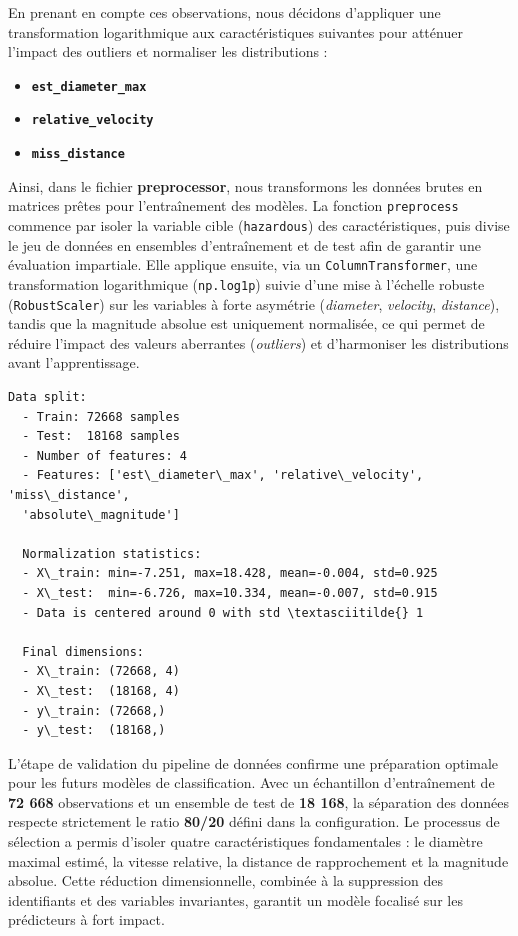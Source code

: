 \documentclass[11pt]{article}
\providecommand{\tightlist}{%
      \setlength{\itemsep}{0pt}\setlength{\parskip}{0pt}}
\begin{document}
En prenant en compte ces observations, nous décidons d'appliquer une
transformation logarithmique aux caractéristiques suivantes pour
atténuer l'impact des outliers et normaliser les distributions :

\begin{itemize}
  \tightlist
  \item
        \textbf{\texttt{est\_diameter\_max}}
  \item
        \textbf{\texttt{relative\_velocity}}
  \item
        \textbf{\texttt{miss\_distance}}
\end{itemize}

Ainsi, dans le fichier \textbf{preprocessor}, nous transformons les
données brutes en matrices prêtes pour l'entraînement des modèles. La
fonction \texttt{preprocess} commence par isoler la variable cible
(\texttt{hazardous}) des caractéristiques, puis divise le jeu de données
en ensembles d'entraînement et de test afin de garantir une évaluation
impartiale. Elle applique ensuite, via un \texttt{ColumnTransformer},
une transformation logarithmique (\texttt{np.log1p}) suivie d'une mise à
l'échelle robuste (\texttt{RobustScaler}) sur les variables à forte
asymétrie (\emph{diameter}, \emph{velocity}, \emph{distance}), tandis
que la magnitude absolue est uniquement normalisée, ce qui permet de
réduire l'impact des valeurs aberrantes (\emph{outliers}) et
d'harmoniser les distributions avant l'apprentissage.

\begin{Verbatim}[commandchars=\\\{\}]
  Data split:
  - Train: 72668 samples
  - Test:  18168 samples
  - Number of features: 4
  - Features: ['est\_diameter\_max', 'relative\_velocity', 'miss\_distance',
  'absolute\_magnitude']

  Normalization statistics:
  - X\_train: min=-7.251, max=18.428, mean=-0.004, std=0.925
  - X\_test:  min=-6.726, max=10.334, mean=-0.007, std=0.915
  - Data is centered around 0 with std \textasciitilde{} 1

  Final dimensions:
  - X\_train: (72668, 4)
  - X\_test:  (18168, 4)
  - y\_train: (72668,)
  - y\_test:  (18168,)
\end{Verbatim}

L'étape de validation du pipeline de données confirme une préparation
optimale pour les futurs modèles de classification. Avec un échantillon
d'entraînement de \textbf{72 668} observations et un ensemble de test de
\textbf{18 168}, la séparation des données respecte strictement le ratio
\textbf{80/20} défini dans la configuration. Le processus de sélection a
permis d'isoler quatre caractéristiques fondamentales : le diamètre
maximal estimé, la vitesse relative, la distance de rapprochement et la
magnitude absolue. Cette réduction dimensionnelle, combinée à la
suppression des identifiants et des variables invariantes, garantit un
modèle focalisé sur les prédicteurs à fort impact.
\end{document}
